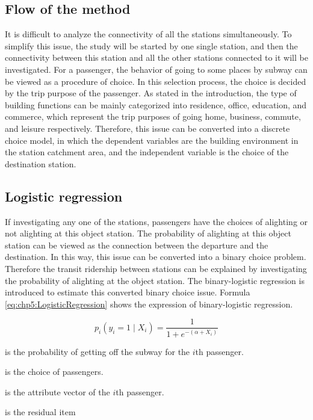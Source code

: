\subsection{Flow of the method}
It is difficult to analyze the connectivity of all the stations simultaneously. To simplify this issue, the study will be started by one single station, and then the connectivity between this station and all the other stations connected to it will be investigated. For a passenger, the behavior of going to some places by subway can be viewed as a procedure of choice. In this selection process, the choice is decided by the trip purpose of the passenger. As stated in the introduction, the type of building functions can be mainly categorized into residence, office, education, and commerce, which represent the trip purposes of going home, business, commute, and leisure respectively. Therefore, this issue can be converted into a discrete choice model, in which the dependent variables are the building environment in the station catchment area, and the independent variable is the choice of the destination station.

%
\subsection{Logistic regression}
If investigating any one of the stations, passengers have the choices of alighting or not alighting at this object station. The probability of alighting at this object station can be viewed as the connection between the departure and the destination. In this way, this issue can be converted into a binary choice problem. Therefore the transit ridership between stations can be explained by investigating the probability of alighting at the object station. The binary-logistic regression is introduced to estimate this converted binary choice issue. Formula \ref{eq:chp5:LogisticRegression} shows the expression of binary-logistic regression.

\begin{equation}
	p_i(y_i=1 \mid X_i)=\frac{1}{1+e^{-(\alpha +X_i)}}
	\label{eq:chp5:LogisticRegression}
\end{equation}

\begin{description}
	\setlength{\parskip}{0\baselineskip} %
	\normalsize
	\item[\textbf{Where:}]
	\item[$p_i$] is the probability of getting off the subway for the $i$th passenger.
	\item[$y$] is the choice of passengers.
	\item[$X_i$] is the attribute vector of the $i$th passenger.
	\item[$\alpha$] is the residual item
	\setlength{\parskip}{0.7\baselineskip} %
\end{description}


